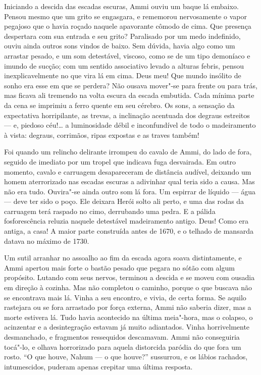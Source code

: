 Iniciando a descida das escadas escuras, Ammi ouviu um baque lá embaixo.
Pensou mesmo que um grito se engasgara, e rememorou nervosamente o vapor
pegajoso que o havia roçado naquele apavorante cômodo de cima. Que
presença despertara com sua entrada e seu grito? Paralisado por um medo
indefinido, ouviu ainda outros sons vindos de baixo. Sem dúvida, havia
algo como um arrastar pesado, e um som detestável, viscoso, como se de
um tipo demoníaco e imundo de sucção; com um sentido associativo levado
a alturas febris, pensou inexplicavelmente no que vira lá em cima. Deus
meu! Que mundo insólito de sonho era esse em que se perdera? Não ousava
mover"-se para frente ou para trás, mas ficava ali tremendo na volta
escura da escada embutida. Cada mínima parte da cena se imprimiu a ferro
quente em seu cérebro. Os sons, a sensação da expectativa horripilante,
as trevas, a inclinação acentuada dos degraus estreitos
--- e, piedoso céu!\ldots{} a
luminosidade débil e inconfundível de todo o madeiramento à vista:
degraus, corrimãos, ripas expostas e as traves também!

Foi quando um relincho delirante irrompeu do cavalo de Ammi, do lado de
fora, seguido de imediato por um tropel que indicava fuga desvairada. Em
outro momento, cavalo e carruagem desapareceram de distância audível,
deixando um homem aterrorizado nas escadas escuras a adivinhar qual
teria sido a causa. Mas não era tudo. Ouvira"-se ainda outro som lá fora.
Um espirrar de líquido --- água
--- deve ter sido o poço. Ele
deixara Herói solto ali perto, e uma das rodas da carruagem terá raspado
no cimo, derrubando uma pedra. E a pálida fosforescência reluzia naquele
detestável madeiramento antigo. Deus! Como era antiga, a casa! A maior
parte construída antes de 1670, e o telhado de mansarda datava no máximo
de 1730.

Um sutil arranhar no assoalho ao fim da escada agora soava
distintamente, e Ammi apertou mais forte o bastão pesado que pegara no
sótão com algum propósito. Lutando com seus nervos, terminou a descida e
se moveu com ousadia em direção à cozinha. Mas não completou o caminho,
porque o que buscava não se encontrava mais lá. Vinha a seu encontro, e
vivia, de certa forma. Se aquilo rastejara ou se fora arrastado por
força externa, Ammi não saberia dizer, mas a morte estivera lá. Tudo
havia acontecido na última meia"-hora, mas o colapso, o acinzentar e a
desintegração estavam já muito adiantados. Vinha horrivelmente
desmanchado, e fragmentos ressequidos descamavam. Ammi não conseguiria
tocá"-lo, e olhava horrorizado para aquela distorcida paródia do que fora
um rosto. ``O que houve, Nahum --- o que houve?'' sussurrou, e os lábios
rachados, intumescidos, puderam apenas crepitar uma última resposta.

